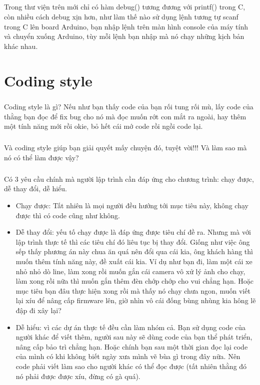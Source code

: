 \documentclass[12pt,a5paper]{book}
\begin{document}
\paragraph{}
Trong thư viện trên mới chỉ có hàm debug() tương đương với printf() trong C, còn nhiều cách debug xịn hơn, như làm thế nào sử dụng lệnh tương tự scanf trong C lên board Arduino, bạn nhập lệnh trên màn hình console của máy tính và chuyển xuống Arduino, tùy mỗi lệnh bạn nhập mà nó chạy những kịch bản khác nhau.
\paragraph{}
\chapter{Coding style}
\paragraph{}
Coding style là gì? Nếu như bạn thấy code của bạn rối tung rối mù, lấy code của thằng bạn đọc để fix bug cho nó mà đọc muốn rớt con mắt ra ngoài, hay thêm một tính năng mới rồi okie, bỏ hết cái mớ code rồi ngồi code lại.
\paragraph{}
Và coding style giúp bạn giải quyết mấy chuyện đó, tuyệt vời!!! Và làm sao mà nó có thể làm được vậy?
\paragraph{}
Có 3 yêu cầu chính mà người lập trình cần đáp ứng cho chương trình: chạy được, dễ thay đổi, dễ hiểu.
\begin{itemize}
  \item Chạy được: Tất nhiên là mọi người đều hướng tới mục tiêu này, không chạy được thì có code cũng như không.
  \item Dễ thay đổi: yếu tố chạy được là đáp ứng được tiêu chí đề ra. Nhưng mà với lập trình thực tế thì các tiêu chí đó liêu tục bị thay đổi. Giống như việc ông sếp thấy phương án này chua ăn quá nên đổi qua cái kia, ông khách hàng thì muốn thêm tính năng này, đề xuất cái kia. Ví dụ như bạn đi, làm một cái xe nhỏ nhỏ dò line, làm xong rồi muốn gắn cái camera vô xử lý ảnh cho chạy, làm xong rồi nữa thì muốn gắn thêm đèn chớp chớp cho vui chẳng hạn. Hoặc mục tiêu bạn đâu thực hiện xong rồi mà thấy nó chạy chưa ngon, muốn viết lại xíu để nâng cấp firmware lên, giờ nhìn vô cái đống bùng nhùng kia hông lẽ đập đi xây lại?
	\item Dễ hiểu: vì các dự án thực tế đều cần làm nhóm cả. Bạn sử dụng code của người khác để viết thêm, người sau này sẽ dùng code của bạn thể phát triển, nâng cấp bảo trì chẳng hạn. Hoặc chính bạn sau một thời gian đọc lại code của mình có khi không biết ngày xưa mình vẽ bùa gì trong đây nữa. Nên code phải viết làm sao cho người khác có thể đọc được (tất nhiên thằng đó nó phải được được xíu, đừng có gà quá).
\end{itemize}
\end{document}
